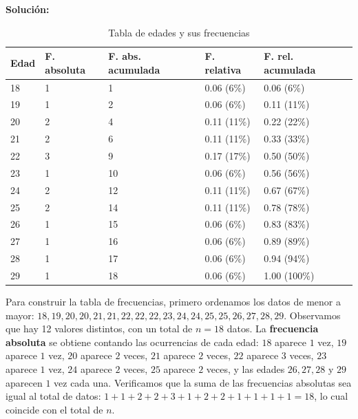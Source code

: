 \documentclass[12pt]{article}
\begin{document}
\textbf{Solución: }

\begin{table}[h!]
    \begin{center}
        \begin{tabular}{|l|l|l|l|l|}
            \hline
            Edad & F. absoluta & F. abs. acumulada & F. relativa & F. rel. acumulada \\
            \hline
            18 & 1 &  1 & 0.06 (6\%) & 0.06 (6\%) \\
            19 & 1 &  2 & 0.06 (6\%) & 0.11 (11\%) \\
            20 & 2 &  4 & 0.11 (11\%) & 0.22 (22\%) \\
            21 & 2 &  6 & 0.11 (11\%) & 0.33 (33\%) \\
            22 & 3 &  9 & 0.17 (17\%) & 0.50 (50\%) \\
            23 & 1 & 10 & 0.06 (6\%) & 0.56 (56\%) \\
            24 & 2 & 12 & 0.11 (11\%) & 0.67 (67\%) \\
            25 & 2 & 14 & 0.11 (11\%) & 0.78 (78\%) \\
            26 & 1 & 15 & 0.06 (6\%) & 0.83 (83\%) \\
            27 & 1 & 16 & 0.06 (6\%) & 0.89 (89\%) \\
            28 & 1 & 17 & 0.06 (6\%) & 0.94 (94\%) \\
            29 & 1 & 18 & 0.06 (6\%) & 1.00 (100\%) \\
            \hline
        \end{tabular}
        \caption{Tabla de edades y sus frecuencias}
        \label{tab:tabla_edades}
    \end{center}
\end{table}

Para construir la tabla de frecuencias, primero ordenamos los datos de menor a mayor: $18, 19, 20, 20, 21, 21, 22, 22, 22, 23, 24, 24, 25, 25, 26, 27, 28, 29$. Observamos que hay 12 valores distintos, con un total de $n = 18$ datos. La \textbf{frecuencia absoluta} se obtiene contando las ocurrencias de cada edad: $18$ aparece $1$ vez, $19$ aparece $1$ vez, $20$ aparece $2$ veces, $21$ aparece $2$ veces, $22$ aparece $3$ veces, $23$ aparece $1$ vez, $24$ aparece $2$ veces, $25$ aparece $2$ veces, y las edades $26, 27, 28$ y $29$ aparecen $1$ vez cada una. Verificamos que la suma de las frecuencias absolutas sea igual al total de datos: $1 + 1 + 2 + 2 + 3 + 1 + 2 + 2 + 1 + 1 + 1 + 1 = 18$, lo cual coincide con el total de $n$.
\end{document}
